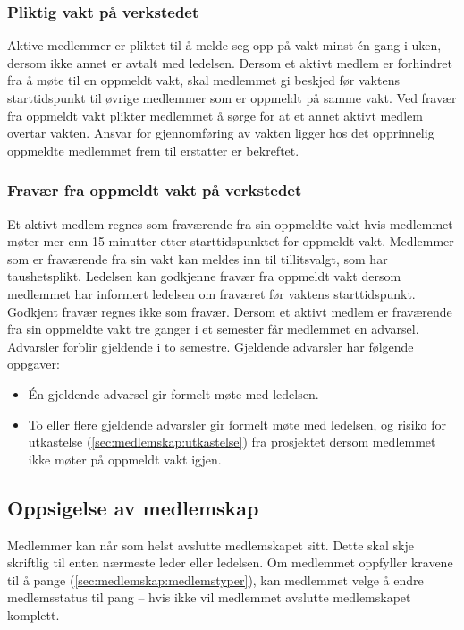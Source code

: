 \subsubsection{Pliktig vakt på verkstedet} \label{sec:medlemskap:medlemsplikter:vaktpaaverksted}
Aktive medlemmer er pliktet til å melde seg opp på vakt minst én gang i uken, dersom ikke annet er avtalt med ledelsen. 
Dersom et aktivt medlem er forhindret fra å møte til en oppmeldt vakt, skal medlemmet gi beskjed før vaktens starttidspunkt til øvrige medlemmer som er oppmeldt på samme vakt.
Ved fravær fra oppmeldt vakt plikter medlemmet å sørge for at et annet aktivt medlem overtar vakten. Ansvar for gjennomføring av vakten ligger hos det opprinnelig oppmeldte medlemmet frem til erstatter er bekreftet.

\subsubsection{Fravær fra oppmeldt vakt på verkstedet} \label{sec:medlemskap:medlemsplikter:fravervakt}
Et aktivt medlem regnes som fraværende fra sin oppmeldte vakt hvis medlemmet møter mer enn 15 minutter etter starttidspunktet for oppmeldt vakt. Medlemmer som er fraværende fra sin vakt kan meldes inn til tillitsvalgt, som har taushetsplikt.
Ledelsen kan godkjenne fravær fra oppmeldt vakt dersom medlemmet har informert ledelsen om fraværet før vaktens starttidspunkt. Godkjent fravær regnes ikke som fravær.
Dersom et aktivt medlem er fraværende fra sin oppmeldte vakt tre ganger i et semester får medlemmet en advarsel.
Advarsler forblir gjeldende i to semestre. Gjeldende advarsler har følgende oppgaver:
\begin{itemize}
\item Én gjeldende advarsel gir formelt møte med ledelsen.
\item To eller flere gjeldende advarsler gir formelt møte med ledelsen, og risiko for utkastelse (\ref{sec:medlemskap:utkastelse}) fra prosjektet dersom medlemmet ikke møter på oppmeldt vakt igjen.
\end{itemize}



\subsection{Oppsigelse av medlemskap}\label{sec:medlemskap:oppsigelse}
Medlemmer kan når som helst avslutte medlemskapet sitt.
Dette skal skje skriftlig til enten nærmeste leder eller ledelsen.
Om medlemmet oppfyller kravene til å pange (\ref{sec:medlemskap:medlemstyper}), kan medlemmet velge å endre medlemsstatus til pang -- hvis ikke vil medlemmet avslutte medlemskapet komplett.

